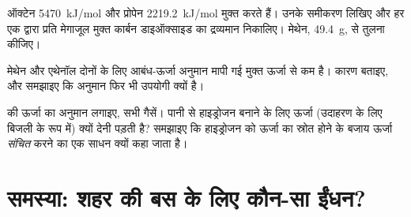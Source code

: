 \begin{exercise}[$\star\star\star$]\label{exo:g11:reaction-energy:13}
ऑक्टेन \qty{5470}{kJ/mol} और प्रोपेन \qty{2219.2}{kJ/mol} मुक्त करते हैं।
उनके  समीकरण लिखिए और हर एक द्वारा प्रति मेगाजूल मुक्त कार्बन डाइऑक्साइड
का द्रव्यमान निकालिए। मेथेन, \qty{49.4}{g}, से तुलना कीजिए।
\end{exercise}

\begin{exercise}[$\star\star\star$]\label{exo:g11:reaction-energy:14}
मेथेन और एथेनॉल दोनों के लिए आबंध-ऊर्जा अनुमान मापी गई
मुक्त ऊर्जा से कम है। कारण बताइए, और समझाइए कि
अनुमान फिर भी उपयोगी क्यों है।
\end{exercise}

\begin{exercise}[$\star\star\star$]\label{exo:g11:reaction-energy:15}
 की ऊर्जा का अनुमान लगाइए, सभी गैसें। पानी से हाइड्रोजन
बनाने के लिए ऊर्जा (उदाहरण के लिए बिजली के रूप में) क्यों देनी पड़ती है?
समझाइए कि हाइड्रोजन को ऊर्जा का स्रोत होने के बजाय ऊर्जा \emph{संचित}
करने का एक साधन क्यों कहा जाता है।
\end{exercise}

\section{समस्या: शहर की बस के लिए कौन-सा ईंधन?}

